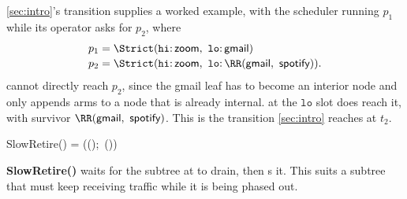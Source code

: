 \cref{sec:intro}'s transition supplies a worked example, with the scheduler running \(p_1\) while its operator asks for \(p_2\), where
{\small
\[
\begin{array}{@{}r@{\;}c@{\;}l@{}}
p_1 &=& \Strict(\mathtt{hi}{:}\,\textsf{zoom},\ \mathtt{lo}{:}\,\textsf{gmail})\\[2pt]
p_2 &=& \Strict(\mathtt{hi}{:}\,\textsf{zoom},\ \mathtt{lo}{:}\,\RR(\textsf{gmail},\allowbreak\ \textsf{spotify})).
\end{array}
\]}
\Add{} cannot directly reach \(p_2\), since the \textsf{gmail} leaf has to become an interior \RR{} node and \Add{} only appends arms to a node that is already internal.
\Replace{} at the \(\mathtt{lo}\) slot does reach it, with survivor \(\RR(\textsf{gmail},\allowbreak\ \textsf{spotify})\).
This is the transition \cref{sec:intro} reaches at \(t_2\).



\newcommand{\SlowRetire}{\textsf{SlowRetire}}

\SlowRetire() \;=\; (();\, \Remove())\\[4pt]

\item \textbf{\SlowRetire(\pth)} waits for the subtree at \pth to drain, then \Remove{}s it.
This suits a subtree that must keep receiving traffic while it is being phased out.




